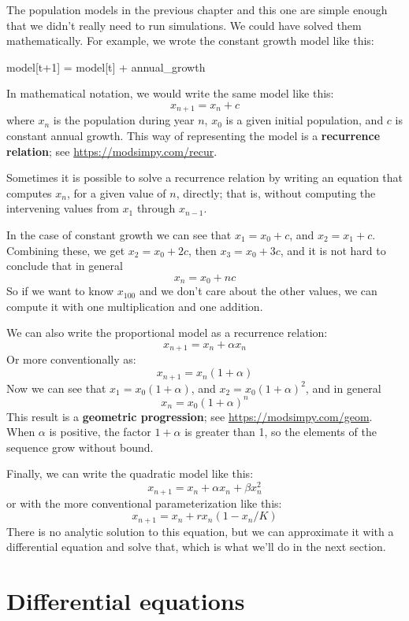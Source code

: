 \documentclass[12pt]{book}
\theoremstyle{exercise}
\begin{document}
The population models in the previous chapter and this one are simple enough that we didn't really need to run simulations.  We could have solved them mathematically.  For example, we wrote the constant growth model like this:

\begin{python}
model[t+1] = model[t] + annual_growth
\end{python}

In mathematical notation, we would write the same model like this:
%
\[ x_{n+1} = x_n + c \]
%
where $x_n$ is the population during year $n$, $x_0$ is a given initial population, and $c$ is constant annual growth.  This way of representing the model is a {\bf recurrence relation}; see \url{https://modsimpy.com/recur}.


Sometimes it is possible to solve a recurrence relation by writing an equation that computes $x_n$, for a given value of $n$, directly; that is, without computing the intervening values from $x_1$ through $x_{n-1}$.

In the case of constant growth we can see that $x_1 = x_0 + c$, and $x_2 = x_1 + c$.  Combining these, we get $x_2 = x_0 + 2c$, then $x_3 = x_0 + 3c$, and it is not hard to conclude that in general
%
\[ x_n = x_0 + nc \]
%
So if we want to know $x_{100}$ and we don't care about the other values, we can compute it with one multiplication and one addition.

We can also write the proportional model as a recurrence relation:
%
\[ x_{n+1} = x_n + \alpha x_n \]
%
Or more conventionally as:
%
\[ x_{n+1} = x_n (1 + \alpha) \]
%
Now we can see that $x_1 = x_0 (1 + \alpha)$, and $x_2 = x_0 (1 + \alpha)^2$, and in general
%
\[ x_n = x_0 (1 + \alpha)^n \]
%
This result is a {\bf geometric progression}; see \url{https://modsimpy.com/geom}.  When $\alpha$ is positive, the factor $1+\alpha$ is greater than 1, so the elements of the sequence grow without bound.


Finally, we can write the quadratic model like this:
%
\[ x_{n+1} = x_n + \alpha x_n + \beta x_n^2 \]
%
or with the more conventional parameterization like this:
%
\[ x_{n+1} = x_n + r x_n (1 - x_n / K) \]
%
There is no analytic solution to this equation, but we can approximate it with a differential equation and solve that, which is what we'll do in the next section.


\section{Differential equations}
\label{diffeq}
\end{document}
